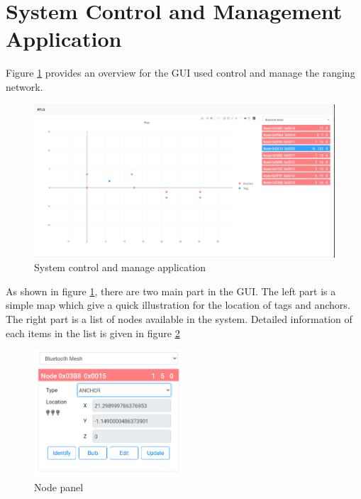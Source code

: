 \documentclass[\main/thesis.tex]{subfiles}
\begin{document}
\section{System Control and Management Application}
Figure \ref{fig:system_control_and_manage_application} provides an overview for the GUI used control and manage the ranging network.
\begin{figure}[H]   
    \centering
    \includegraphics[width=1\textwidth]{system_control_and_manage_application.png}
    \caption{System control and manage application}
    \label{fig:system_control_and_manage_application}
\end{figure}
As shown in figure \ref{fig:system_control_and_manage_application}, there are two main part in the GUI. The left part is a simple map which give a quick illustration for the location of tags and anchors. The right part is a list of nodes available in the system. Detailed information of each items in the list is given in figure \ref{fig:control_and_manage_pannel}

\begin{figure}[H]   
    \centering
    \includegraphics[width=0.5\textwidth]{control_and_manage_pannel.png}
    \caption{Node panel}
    \label{fig:control_and_manage_pannel}
\end{figure}
\end{document}
